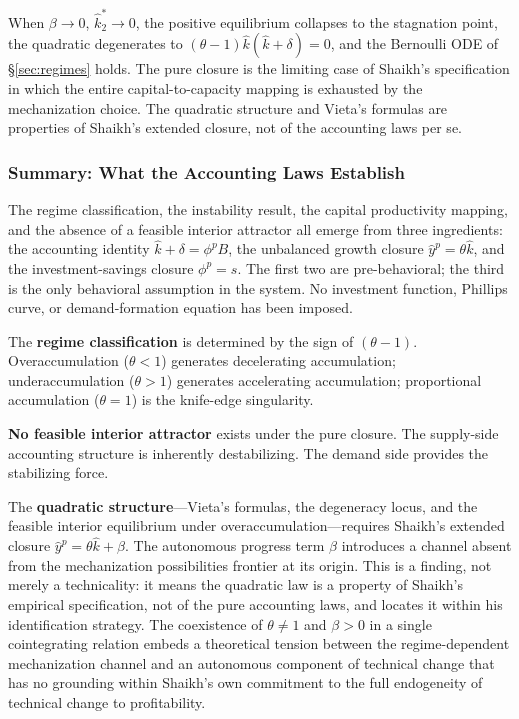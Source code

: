 When $\beta \to 0$, $\hat{k}_2^* \to 0$, the positive equilibrium collapses to the stagnation point, the quadratic degenerates to $(\theta - 1)\hat{k}(\hat{k} + \delta) = 0$, and the Bernoulli ODE of \S\ref{sec:regimes} holds. The pure closure is the limiting case of Shaikh's specification in which the entire capital-to-capacity mapping is exhausted by the mechanization choice. The quadratic structure and Vieta's formulas are properties of Shaikh's extended closure, not of the accounting laws per se.



\subsubsection{Summary: What the Accounting Laws Establish}
\label{sec:accounting_summary}

The regime classification, the instability result, the capital productivity mapping, and the absence of a feasible interior attractor all emerge from three ingredients: the accounting identity $\hat{k} + \delta = \phi^p B$, the unbalanced growth closure $\hat{y}^p = \theta\hat{k}$, and the investment-savings closure $\phi^p = s$. The first two are pre-behavioral; the third is the only behavioral assumption in the system. No investment function, Phillips curve, or demand-formation equation has been imposed.

The \textbf{regime classification} is determined by the sign of $(\theta - 1)$. Overaccumulation ($\theta < 1$) generates decelerating accumulation; underaccumulation ($\theta > 1$) generates accelerating accumulation; proportional accumulation ($\theta = 1$) is the knife-edge singularity.

\textbf{No feasible interior attractor} exists under the pure closure. The supply-side accounting structure is inherently destabilizing. The demand side provides the stabilizing force.

The \textbf{quadratic structure}---Vieta's formulas, the degeneracy locus, and the feasible interior equilibrium under overaccumulation---requires Shaikh's extended closure $\hat{y}^p = \theta\hat{k} + \beta$. The autonomous progress term $\beta$ introduces a channel absent from the mechanization possibilities frontier at its origin. This is a finding, not merely a technicality: it means the quadratic law is a property of Shaikh's empirical specification, not of the pure accounting laws, and locates it within his identification strategy. The coexistence of $\theta \neq 1$ and $\beta > 0$ in a single cointegrating relation embeds a theoretical tension between the regime-dependent mechanization channel and an autonomous component of technical change that has no grounding within Shaikh's own commitment to the full endogeneity of technical change to profitability.

